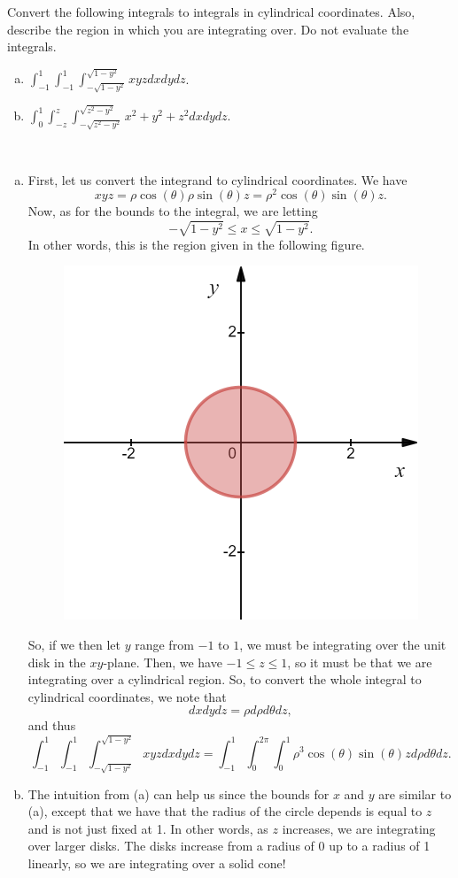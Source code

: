 \documentclass[12pt]{article} %
\begin{document}
\newpage
\begin{problem}
    Convert the following integrals to integrals in cylindrical coordinates. Also, describe the region in which you are integrating over. Do not evaluate the integrals.
    \begin{enumerate}[(a)]
        \item $\displaystyle{\int_{-1}^{1} \int_{-1}^{1} \int_{-\sqrt{1-y^2}}^{\sqrt{1-y^2}} xyz dxdydz}$.
        \item $\displaystyle{\int_0^1 \int_{-z}^z \int_{-\sqrt{z^2-y^2}}^{\sqrt{z^2-y^2}} x^2+y^2+z^2 dxdydz}$.
    \end{enumerate}
\end{problem}
\begin{solution}~
\begin{enumerate}[(a)]
    \item First, let us convert the integrand to cylindrical coordinates. We have
    \[
    xyz = \rho \cos (\theta) \rho \sin(\theta) z = \rho^2 \cos(\theta)\sin(\theta)z.
    \]
    Now, as for the bounds to the integral, we are letting
    \[
    -\sqrt{1-y^2}\leq x \leq \sqrt{1-y^2}.
    \]
    In other words, this is the region given in the following figure.
    \begin{figure}[H]
        \centering    
    \includegraphics[width=.6\textwidth]{figures/disk.png}
    \end{figure} 
    So, if we then let $y$ range from $-1$ to $1$, we must be integrating over the unit disk in the $xy$-plane.  Then, we have $-1\leq z\leq 1$, so it must be that we are integrating over a cylindrical region.  So, to convert the whole integral to cylindrical coordinates, we note that
    \[
    dxdydz = \rho d\rho d\theta dz,
    \]
    and thus
    \[
    \int_{-1}^{1} \int_{-1}^{1} \int_{-\sqrt{1-y^2}}^{\sqrt{1-y^2}} xyz dxdydz = \int_{-1}^1 \int_{0}^{2\pi} \int_{0}^1 \rho^3 \cos(\theta)\sin(\theta)z d\rho d\theta dz.
    \]
    \item The intuition from (a) can help us since the bounds for $x$ and $y$ are similar to (a), except that we have that the radius of the circle depends is equal to $z$ and is not just fixed at 1. In other words, as $z$ increases, we are integrating over larger disks. The disks increase from a radius of 0 up to a radius of 1 linearly, so we are integrating over a solid cone!


\end{enumerate}
\end{solution}
\end{document}
